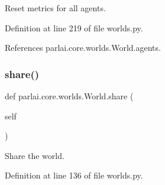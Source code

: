 \begin{DoxyVerb}Reset metrics for all agents.\end{DoxyVerb}
 

Definition at line 219 of file worlds.\+py.



References parlai.\+core.\+worlds.\+World.\+agents.

\mbox{\label{classparlai_1_1core_1_1worlds_1_1World_a08d9212397f136cbc52ee224bcb0bc4e}} 
\subsubsection{\texorpdfstring{share()}{share()}}
{\footnotesize\ttfamily def parlai.\+core.\+worlds.\+World.\+share (\begin{DoxyParamCaption}\item[{}]{self }\end{DoxyParamCaption})}

\begin{DoxyVerb}Share the world.\end{DoxyVerb}
 

Definition at line 136 of file worlds.\+py.



